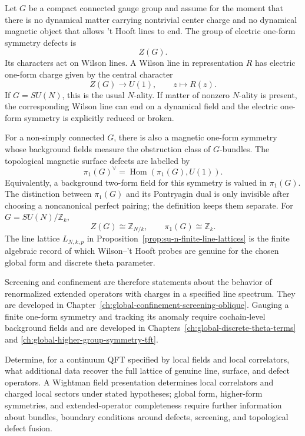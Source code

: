 Let \(G\) be a compact connected gauge group and assume for the moment that
there is no dynamical matter carrying nontrivial center charge and no
dynamical magnetic object that allows 't Hooft lines to end.  The group of
electric one-form symmetry defects is
\[
  Z(G).
\]
Its characters act on Wilson lines.  A Wilson line in representation \(R\)
has electric one-form charge given by the central character
\[
  Z(G)\longrightarrow U(1),
  \qquad
  z\longmapsto R(z).
\]
If \(G=SU(N)\), this is the usual \(N\)-ality.  If matter of nonzero
\(N\)-ality is present, the corresponding Wilson line can end on a dynamical
field and the electric one-form symmetry is explicitly reduced or broken.

For a non-simply connected \(G\), there is also a magnetic one-form symmetry
whose background fields measure the obstruction class of \(G\)-bundles.
The topological magnetic surface defects are labelled by
\[
  \pi_1(G)^\vee=\operatorname{Hom}(\pi_1(G),U(1)).
\]
Equivalently, a background two-form field for this symmetry is valued in
\(\pi_1(G)\).  The distinction between \(\pi_1(G)\) and its Pontryagin dual
is only invisible after choosing a noncanonical perfect pairing; the
definition keeps them separate.  For \(G=SU(N)/\mathbb Z_k\),
\[
  Z(G)\cong \mathbb Z_{N/k},
  \qquad
  \pi_1(G)\cong \mathbb Z_k .
\]
The line lattice \(L_{N,k,p}\) in
Proposition~\ref{prop:su-n-finite-line-lattices} is the finite algebraic
record of which Wilson--'t Hooft probes are genuine for the chosen global
form and discrete theta parameter.

Screening and confinement are therefore statements about the behavior of
renormalized extended operators with charges in a specified line spectrum.
They are developed in
Chapter~\ref{ch:global-confinement-screening-oblique}.  Gauging a finite
one-form symmetry and tracking its anomaly require cochain-level background
fields and are developed in
Chapters~\ref{ch:global-discrete-theta-terms} and
\ref{ch:global-higher-group-symmetry-tft}.

\begin{openproblem}
\label{op:global-structure-from-local-data}
Determine, for a continuum QFT specified by local fields and local
correlators, what additional data recover the full lattice of genuine line,
surface, and defect operators.  A Wightman field presentation determines
local correlators and charged local sectors under stated hypotheses; global
form, higher-form symmetries, and extended-operator completeness require
further information about bundles, boundary conditions around defects,
screening, and topological defect fusion.
\end{openproblem}
